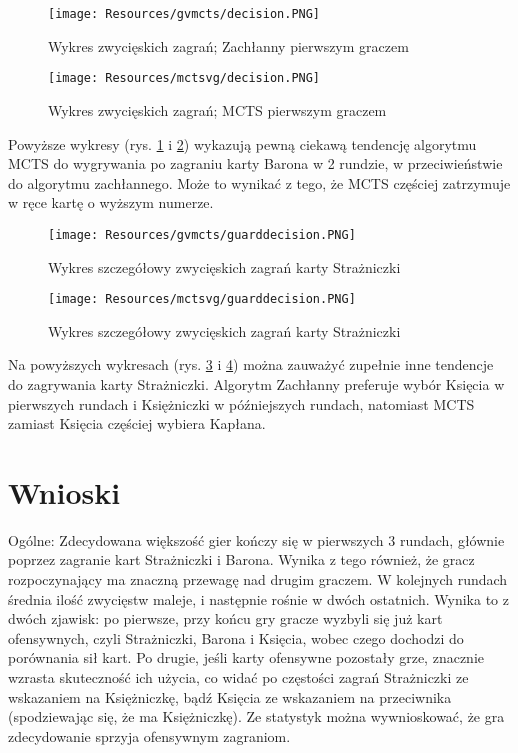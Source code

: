 \begin{figure}[H]
	\centering
	\texttt{[image: Resources/gvmcts/decision.PNG]}
	\caption{Wykres zwycięskich zagrań; Zachłanny pierwszym graczem} 
	\label{fig:gvmctsdecision}
\end{figure} 

\begin{figure}[H]
	\centering
	\texttt{[image: Resources/mctsvg/decision.PNG]}
	\caption{Wykres zwycięskich zagrań; MCTS pierwszym graczem} 
	\label{fig:mctsvgdecision}
\end{figure} 

Powyższe wykresy (rys. \ref{fig:gvmctsdecision} i \ref{fig:mctsvgdecision}) wykazują pewną ciekawą tendencję algorytmu MCTS do wygrywania po zagraniu karty Barona w 2 rundzie, w przeciwieństwie do algorytmu zachłannego. Może to wynikać z tego, że MCTS częściej zatrzymuje w ręce kartę o wyższym numerze.

\begin{figure}[H]
	\centering
	\texttt{[image: Resources/gvmcts/guarddecision.PNG]}
	\caption{Wykres szczegółowy zwycięskich zagrań karty Strażniczki} 
	\label{fig:gvmctguarddecision}
\end{figure}

\begin{figure}[H]
	\centering
	\texttt{[image: Resources/mctsvg/guarddecision.PNG]}
	\caption{Wykres szczegółowy zwycięskich zagrań karty Strażniczki} 
	\label{fig:mctsvgguarddecision}
\end{figure}

Na powyższych wykresach (rys. \ref{fig:gvmctguarddecision} i \ref{fig:mctsvgguarddecision}) można zauważyć zupełnie inne tendencje do zagrywania karty Strażniczki. Algorytm Zachłanny preferuje wybór Księcia w pierwszych rundach i Księżniczki w późniejszych rundach, natomiast MCTS zamiast Księcia częściej wybiera Kapłana.

\section{Wnioski}
Ogólne:
Zdecydowana większość gier kończy się w pierwszych 3 rundach, głównie poprzez zagranie kart Strażniczki i Barona. Wynika z tego również, że gracz rozpoczynający ma znaczną przewagę nad drugim graczem. W kolejnych rundach średnia ilość zwycięstw maleje, i następnie rośnie w dwóch ostatnich. Wynika to z dwóch zjawisk: po pierwsze, przy końcu gry gracze wyzbyli się już kart ofensywnych, czyli Strażniczki, Barona i Księcia, wobec czego dochodzi do porównania sił kart. Po drugie, jeśli karty ofensywne pozostały grze, znacznie wzrasta skuteczność ich użycia, co widać po częstości zagrań Strażniczki ze wskazaniem na Księżniczkę, bądź Księcia ze wskazaniem na przeciwnika (spodziewając się, że ma Księżniczkę). Ze statystyk można wywnioskować, że gra zdecydowanie sprzyja ofensywnym zagraniom.

